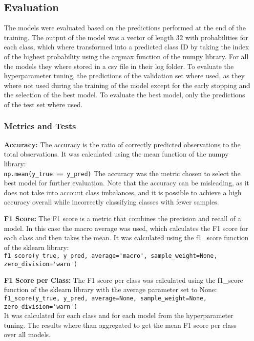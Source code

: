 

\subsection{Evaluation}%

The models were evaluated based on the predictions performed at the end of the training.
The output of the model was a vector of length 32 with probabilities for each class, which where
transformed into a predicted class ID by taking the index of the highest probability
using the argmax function of the numpy library. For all the models they where stored in a csv file
in their log folder. To evaluate the hyperparameter tuning, the predictions of the validation set
where used, as they where not used during the training of the model except for the early stopping
and the selection of the best model. To evaluate the best model, only the predictions of the test set
where used.

\subsubsection{Metrics and Tests}

\textbf{Accuracy:} The accuracy is the ratio of correctly predicted observations to the total observations.
It was calculated using the mean function of the numpy library:\\ 
\lstinline{np.mean(y_true == y_pred)}
The accuracy was the metric chosen to select the best model for further evaluation.
Note that the accuracy can be misleading, as it does not take into account class imbalances, 
and it is possible to achieve a high accuracy overall while incorrectly classifying classes with fewer samples.

\textbf{F1 Score:} The F1 score is a metric that combines the precision and recall of a model. In this
case the macro average was used, which calculates the F1 score for each class and then takes the mean.
It was calculated using the f1\_score function of the sklearn library:\\ 
\lstinline{f1_score(y_true, y_pred, average='macro', sample_weight=None, zero_division='warn')}

\textbf{F1 Score per Class:} The F1 score per class was calculated
using the f1\_score function of the sklearn library with the average parameter set to None:\\
\lstinline{f1_score(y_true, y_pred, average=None, sample_weight=None, zero_division='warn')}\\
It was calculated for each class and for each model from the hyperparameter tuning. The results
where than aggregated to get the mean F1 score per class over all models.

